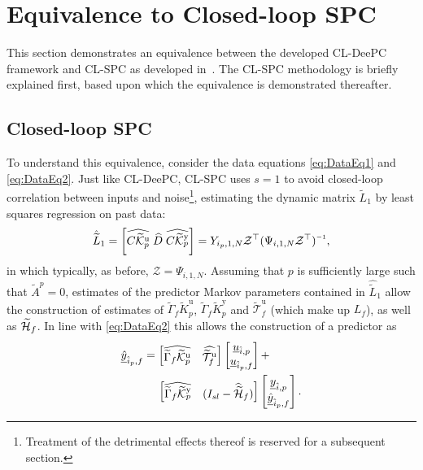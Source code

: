 \section{Equivalence to Closed-loop \acs{SPC}}
This section demonstrates an equivalence between the developed \ac{CL-DeePC} framework and \ac{CL-SPC} as developed in~\cite{Dong2008}. The \ac{CL-SPC} methodology is briefly explained first, based upon which the equivalence is demonstrated thereafter.

\subsection{Closed-loop \ac{SPC}}
To understand this equivalence, consider the data equations \eqref{eq:DataEq1} and \eqref{eq:DataEq2}. Just like \ac{CL-DeePC}, \ac{CL-SPC} uses $s=1$ to avoid closed-loop correlation between inputs and noise\footnote{Treatment of the detrimental effects thereof is reserved for a subsequent section.}, estimating the dynamic matrix $\widetilde{L}_1$ by least squares regression on past data:
\begin{align}\label{eq:CL-SPC-PredMarkov}
\hat{\widetilde{L}}_1 = \left[ \widehat{C\tKp{u}} \; \widehat{D} \; \widehat{C\tKp{y}} \right]=Y_{i_p,1,N}\mathcal{Z}^\top (\Psi_{i,1,N}\mathcal{Z}^\top)\inv,
\end{align}
in which typically, as before, $\mathcal{Z}=\Psi_{i,1,N}$. Assuming that $p$ is sufficiently large such that $\widetilde{A}^p=0$, estimates of the predictor Markov parameters contained in $\hat{\widetilde{L}}_1$ allow the construction of estimates of $\widetilde{\Gamma}_f\widetilde{K}_p^\mathrm{u}$, $\widetilde{\Gamma}_f\widetilde{K}_p^\mathrm{y}$ and $\widetilde{\mathcal{T}}_f^\mathrm{u}$ (which make up $L_f$), as well as $\widetilde{\mathcal{H}}_f$. In line with \eqref{eq:DataEq2} this allows the construction of a predictor as
\begin{align}\label{eq:CL-SPC-pred1}
	\begin{split}
	\underline{\hat{y}}_{\hat{i}_p,f}&= \begin{bmatrix}\widehat{\widetilde{\Gamma}_f\widetilde{\mathcal{K}}_{p}^{\mathrm{{u}}}} & \widehat{\widetilde{\mathcal{T}}_f^\mathrm{u}} \end{bmatrix} 
	\begin{bmatrix}
		\underline{u}_{\hat{i},p}\\
		\underline{u}_{\hat{i}_p,f}
	\end{bmatrix}+\\
	&\phantom{=}\mkern8mu\begin{bmatrix}
		\widehat{\widetilde{\Gamma}_f\widetilde{\mathcal{K}}_{p}^{\mathrm{{y}}}} & (I_{sl}-\widehat{\widetilde{\mathcal{H}}}_f) \end{bmatrix} 
	\begin{bmatrix}
		\underline{y}_{\hat{i},p}\\
		\underline{\hat{y}}_{\hat{i}_p,f}
	\end{bmatrix}.
	\end{split}
\end{align}
